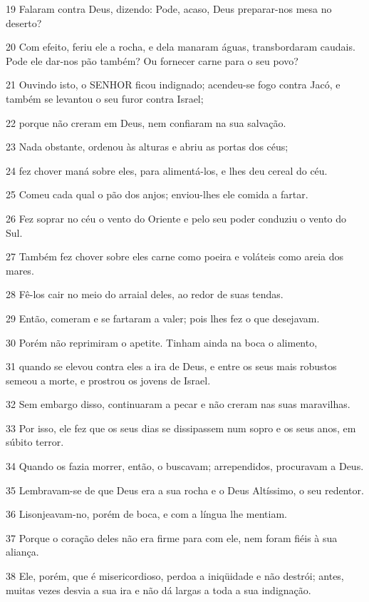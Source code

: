 \par 19 Falaram contra Deus, dizendo: Pode, acaso, Deus preparar-nos mesa no deserto?
\par 20 Com efeito, feriu ele a rocha, e dela manaram águas, transbordaram caudais. Pode ele dar-nos pão também? Ou fornecer carne para o seu povo?
\par 21 Ouvindo isto, o SENHOR ficou indignado; acendeu-se fogo contra Jacó, e também se levantou o seu furor contra Israel;
\par 22 porque não creram em Deus, nem confiaram na sua salvação.
\par 23 Nada obstante, ordenou às alturas e abriu as portas dos céus;
\par 24 fez chover maná sobre eles, para alimentá-los, e lhes deu cereal do céu.
\par 25 Comeu cada qual o pão dos anjos; enviou-lhes ele comida a fartar.
\par 26 Fez soprar no céu o vento do Oriente e pelo seu poder conduziu o vento do Sul.
\par 27 Também fez chover sobre eles carne como poeira e voláteis como areia dos mares.
\par 28 Fê-los cair no meio do arraial deles, ao redor de suas tendas.
\par 29 Então, comeram e se fartaram a valer; pois lhes fez o que desejavam.
\par 30 Porém não reprimiram o apetite. Tinham ainda na boca o alimento,
\par 31 quando se elevou contra eles a ira de Deus, e entre os seus mais robustos semeou a morte, e prostrou os jovens de Israel.
\par 32 Sem embargo disso, continuaram a pecar e não creram nas suas maravilhas.
\par 33 Por isso, ele fez que os seus dias se dissipassem num sopro e os seus anos, em súbito terror.
\par 34 Quando os fazia morrer, então, o buscavam; arrependidos, procuravam a Deus.
\par 35 Lembravam-se de que Deus era a sua rocha e o Deus Altíssimo, o seu redentor.
\par 36 Lisonjeavam-no, porém de boca, e com a língua lhe mentiam.
\par 37 Porque o coração deles não era firme para com ele, nem foram fiéis à sua aliança.
\par 38 Ele, porém, que é misericordioso, perdoa a iniqüidade e não destrói; antes, muitas vezes desvia a sua ira e não dá largas a toda a sua indignação.
